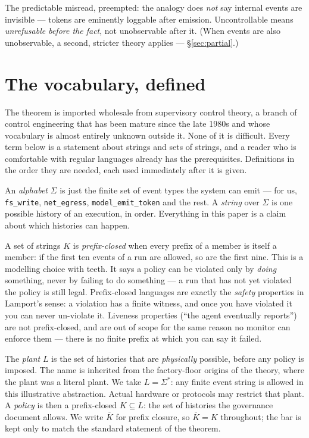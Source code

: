 \documentclass[11pt,a4paper]{article}  \usepackage{mdframed} \usepackage{graphicx} \usepackage{tabularx}
\begin{document}
The predictable misread, preempted: the analogy does \emph{not} say internal events are invisible --- tokens are eminently
loggable after emission. Uncontrollable means \emph{unrefusable before the fact}, not unobservable after it. (When events are
also unobservable, a second, stricter theory applies --- \S\ref{sec:partial}.)



\section{The vocabulary, defined}\label{sec:vocab} The theorem is imported wholesale from supervisory control theory, a
branch of control engineering that has been mature since the late 1980s and whose vocabulary is almost entirely unknown
outside it. None of it is difficult. Every term below is a statement about strings and sets of strings, and a reader who is
comfortable with regular languages already has the prerequisites. Definitions in the order they are needed, each used
immediately after it is given.

An \emph{alphabet} $\Sigma$ is just the finite set of event types the system can emit --- for us, \texttt{fs\_\allowbreak write},
\texttt{net\_\allowbreak egress}, \texttt{model\_\allowbreak emit\_\allowbreak token} and the rest. A \emph{string} over $\Sigma$ is one possible history of an
execution, in order. Everything in this paper is a claim about which histories can happen.

A set of strings $K$ is \emph{prefix-closed} when every prefix of a member is itself a member: if the first ten events of a
run are allowed, so are the first nine. This is a modelling choice with teeth. It says a policy can be violated only by
\emph{doing} something, never by failing to do something --- a run that has not yet violated the policy is still legal.
Prefix-closed languages are exactly the \emph{safety} properties in Lamport's sense: a violation has a finite witness, and
once you have violated it you can never un-violate it. Liveness properties (``the agent eventually reports'') are not
prefix-closed, and are out of scope for the same reason no monitor can enforce them --- there is no finite prefix at which
you can say it failed.

The \emph{plant} $L$ is the set of histories that are \emph{physically} possible, before any policy is imposed. The name is
inherited from the factory-floor origins of the theory, where the plant was a literal plant. We take $L=\Sigma^*$: any
finite event string is allowed in this illustrative abstraction. Actual hardware or protocols may restrict that plant. A \emph{policy} is then a prefix-closed
$K\subseteq L$: the set of histories the governance document allows. We write $\overline{K}$ for prefix closure, so
$\overline{K}=K$ throughout; the bar is kept only to match the standard statement of the theorem.
\end{document}
